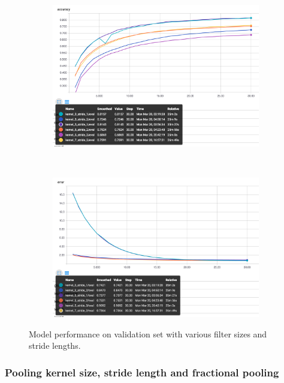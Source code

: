\documentclass[12pt]{article}
\begin{document}
\begin{figure}[ht!]
    \centering
    \begin{subfigure}[t]{0.475\textwidth}
        \centering
        \includegraphics[width=1.0\linewidth]{filtera.png}
    \end{subfigure}%
    ~ 
    \begin{subfigure}[t]{0.475\textwidth}
        \centering
        \includegraphics[width=1.0\linewidth]{filtere.png}
    \end{subfigure}
    \caption{Model performance on validation set with various filter sizes and stride lengths. }
    \label{fig:filter}
\end{figure}


\subsubsection*{Pooling kernel size, stride length and fractional pooling}
\end{document}
